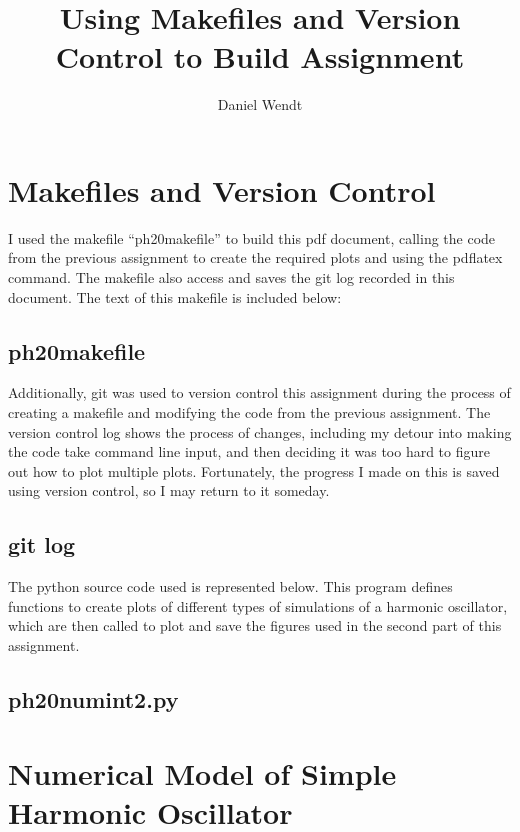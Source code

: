 \documentclass{article}
\title{Using Makefiles and Version Control to Build Assignment}
\author{Daniel Wendt}
\begin{document}
\maketitle

\section{Makefiles and Version Control}

I used the makefile ``ph20makefile'' to build this pdf document, calling the code from the previous assignment to create the required plots and using the pdflatex command. The makefile also access and saves the git log recorded in this document. The text of this makefile is included below:

\subsection*{ph20makefile}
\texttt{}

Additionally, git was used to version control this assignment during the process of creating a makefile and modifying the code from the previous assignment. The version control log shows the process of changes, including my detour into making the code take command line input, and then deciding it was too hard to figure out how to plot multiple plots. Fortunately, the progress I made on this is saved using version control, so I may return to it someday. 

\subsection*{git log}
\texttt{}

The python source code used is represented below. This program defines functions to create plots of different types of simulations of a harmonic oscillator, which are then called to plot and save the figures used in the second part of this assignment.

\subsection*{ph20numint2.py}
\texttt{}

\section{Numerical Model of Simple Harmonic Oscillator}
\end{document}
